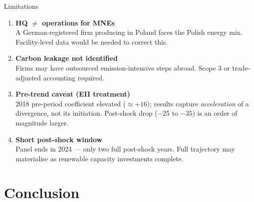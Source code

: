 \documentclass[10pt]{beamer}
\begin{document}
\begin{frame}{Limitations}
  \begin{enumerate}
    \item \textbf{HQ $\neq$ operations for MNEs}\\
      {\small A German-registered firm producing in Poland faces the Polish energy mix.
      Facility-level data would be needed to correct this.}

    \vspace{0.4em}

    \item \textbf{Carbon leakage not identified}\\
      {\small Firms may have outsourced emission-intensive steps abroad.
      Scope 3 or trade-adjusted accounting required.}

    \vspace{0.4em}

    \item \textbf{Pre-trend caveat (EII treatment)}\\
      {\small 2018 pre-period coefficient elevated ($\approx +16$); results capture \emph{acceleration}
      of a divergence, not its initiation. Post-shock drop ($-25$ to $-35$) is an order of magnitude larger.}

    \vspace{0.4em}

    \item \textbf{Short post-shock window}\\
      {\small Panel ends in 2024 --- only two full post-shock years. Full trajectory may materialise
      as renewable capacity investments complete.}
  \end{enumerate}
\end{frame}

\section{Conclusion}
\end{document}
